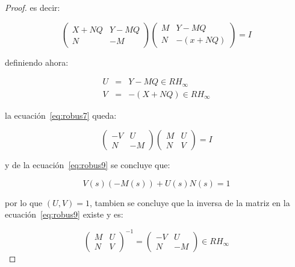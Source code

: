 \begin{proof}
            es decir:

            \begin{equation} \label{eq:robus7}
                \begin{pmatrix}
                    X + NQ & Y- MQ \\
                    N & -M
                \end{pmatrix}
                \begin{pmatrix}
                    M & Y - MQ \\
                    N & -(x + NQ)
                \end{pmatrix} = I
            \end{equation}

            definiendo ahora:

            \begin{eqnarray} \label{eq:robus8}
                U & = & Y - MQ \in RH_{\infty} \nonumber \\
                V & = & -(X + NQ) \in RH_{\infty}
            \end{eqnarray}

            la ecuación~\ref{eq:robus7} queda:

            \begin{equation} \label{eq:robus9}
                \begin{pmatrix}
                    -V & U \\
                    N & -M
                \end{pmatrix}
                \begin{pmatrix}
                    M & U \\
                    N & V
                \end{pmatrix} = I
            \end{equation}

            y de la ecuación~\ref{eq:robus9} se concluye que:

            \begin{equation*}
                V(s)(-M(s)) + U(s)N(s) = 1
            \end{equation*}

            por lo que $(U, V) = 1$, tambien se concluye que la inversa de la matriz en la ecuación~\ref{eq:robus9} existe y es:

            \begin{equation}
                \begin{pmatrix}
                    M & U \\
                    N & V
                \end{pmatrix}^{-1} =
                \begin{pmatrix}
                    -V & U \\
                    N & -M
                \end{pmatrix} \in RH_{\infty}
            \end{equation}


\end{proof}
